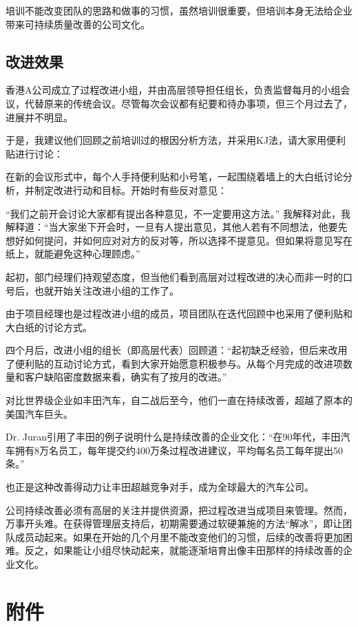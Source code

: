 培训不能改变团队的思路和做事的习惯，虽然培训很重要，但培训本身无法给企业带来可持续质量改善的公司文化。

\hypertarget{ux6539ux8fdbux6548ux679c}{%
\subsection{改进效果}\label{ux6539ux8fdbux6548ux679c}}

香港A公司成立了过程改进小组，并由高层领导担任组长，负责监督每月的小组会议，代替原来的传统会议。尽管每次会议都有纪要和待办事项，但三个月过去了，进展并不明显。

于是，我建议他们回顾之前培训过的根因分析方法，并采用KJ法，请大家用便利贴进行讨论：

在新的会议形式中，每个人手持便利贴和小号笔，一起围绕着墙上的大白纸讨论分析，并制定改进行动和目标。开始时有些反对意见：



``我们之前开会讨论大家都有提出各种意见，不一定要用这方法。''
我解释对此，我解释道：“当大家坐下开会时，一旦有人提出意见，其他人若有不同想法，他要先想好如何提问，并如何应对对方的反对等，所以选择不提意见。但如果将意见写在纸上，就能避免这种心理顾虑。”

起初，部门经理们持观望态度，但当他们看到高层对过程改进的决心而非一时的口号后，也就开始关注改进小组的工作了。

由于项目经理也是过程改进小组的成员，项目团队在迭代回顾中也采用了便利贴和大白纸的讨论方式。



四个月后，改进小组的组长（即高层代表）回顾道：“起初缺乏经验，但后来改用了便利贴的互动讨论方式，看到大家开始愿意积极参与。从每个月完成的改进项数量和客户缺陷密度数据来看，确实有了按月的改进。”


对比世界级企业如丰田汽车，自二战后至今，他们一直在持续改善，超越了原本的美国汽车巨头。

Dr. Juran引用了丰田的例子说明什么是持续改善的企业文化：“在90年代，丰田汽车拥有8万名员工，每年提交约400万条过程改进建议，平均每名员工每年提出50条。”


也正是这种改善得动力让丰田超越竞争对手，成为全球最大的汽车公司。

公司持续改善必须有高层的关注并提供资源，把过程改进当成项目来管理。然而，万事开头难。在获得管理层支持后，初期需要通过软硬兼施的方法“解冰”，即让团队成员动起来。如果在开始的几个月里不能改变他们的习惯，后续的改善将更加困难。反之，如果能让小组尽快动起来，就能逐渐培育出像丰田那样的持续改善的企业文化。

\hypertarget{ux9644ux4ef6}{%
\section{附件}\label{ux9644ux4ef6}}

